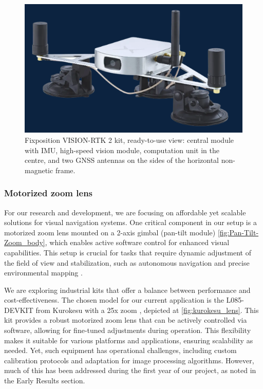 \documentclass[runningheads]{llncs}
\begin{document}
\begin{figure}
    \centering
    \includegraphics[width=0.75\linewidth]{img/FixpositionRTK2_Kit.png}
    \caption{Fixposition VISION-RTK 2 kit, ready-to-use view: central module with IMU, high-speed vision module, computation unit in the centre, and two GNSS antennas on the sides of the horizontal non-magnetic frame.}
    \label{fig:Fixposition RTK-2 kit}
\end{figure}


\subsubsection{Motorized zoom lens}

For our research and development, we are focusing on affordable yet scalable solutions for visual navigation systems. One critical component in our setup is a motorized zoom lens mounted on a 2-axis gimbal (pan-tilt module) \ref{fig:Pan-Tilt-Zoom_body}, which enables active software control for enhanced visual capabilities. This setup is crucial for tasks that require dynamic adjustment of the field of view and stabilization, such as autonomous navigation and precise environmental mapping \cite{PointMeIntoRightDirection}.

We are exploring industrial kits that offer a balance between performance and cost-effectiveness. The chosen model for our current application is the L085-DEVKIT from Kurokesu with a 25x zoom \cite{kurokesu_l085_devkit}, depicted at \ref{fig:kurokesu_lens}. This kit provides a robust motorized zoom lens that can be actively controlled via software, allowing for fine-tuned adjustments during operation. This flexibility makes it suitable for various platforms and applications, ensuring scalability as needed. Yet, such equipment has operational challenges, including custom calibration protocols and adaptation for image processing algorithms. However, much of this has been addressed during the first year of our project, as noted in the Early Results section.
\end{document}
